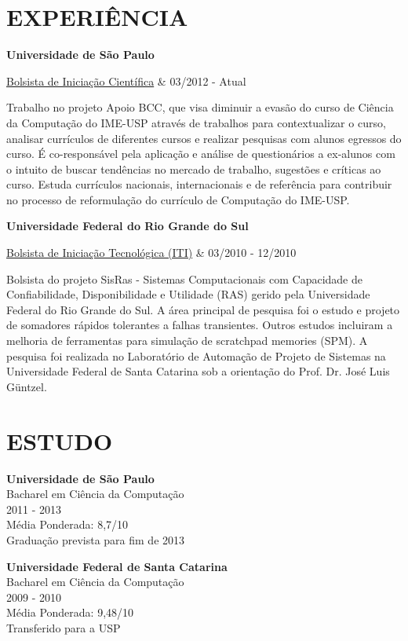 \documentclass[margin=<value>,11pt]{res} %
\begin{document}
\begin{resume}
\section{EXPERIÊNCIA}
	{\bf Universidade de São Paulo} \\
		\begin{ncolumn}{2} %
		\underline{Bolsista de Iniciação Científica}     &      03/2012 - Atual
		\end{ncolumn}
		Trabalho no projeto Apoio BCC, que visa diminuir a evasão do curso de Ciência da Computação do IME-USP através de trabalhos para contextualizar o curso, analisar currículos de diferentes cursos e realizar pesquisas com alunos egressos do curso. É co-responsável pela aplicação e análise de questionários a ex-alunos com o intuito de buscar tendências no mercado de trabalho, sugestões e críticas ao curso. Estuda currículos nacionais, internacionais e de referência para contribuir no processo de reformulação do currículo de Computação do IME-USP.

	{\bf Universidade Federal do Rio Grande do Sul} \\
		\begin{ncolumn}{2} %
		\underline{Bolsista de Iniciação Tecnológica (ITI)}     &      03/2010 - 12/2010
		\end{ncolumn}
		Bolsista do projeto SisRas - Sistemas Computacionais com Capacidade de Confiabilidade, Disponibilidade e Utilidade (RAS) gerido pela Universidade Federal do Rio Grande do Sul. A área principal de pesquisa foi o estudo e projeto de somadores rápidos tolerantes a falhas transientes. Outros estudos incluiram a melhoria de ferramentas para simulação de scratchpad memories (SPM). A pesquisa foi realizada no Laboratório de Automação de Projeto de Sistemas na Universidade Federal de Santa Catarina sob a orientação do Prof. Dr. José Luis Güntzel.

 
\section{ESTUDO} 
	{\bf Universidade de São Paulo}\\
	Bacharel em Ciência da Computação \\
	2011 - 2013 \\
	Média Ponderada: 8,7/10 \\
	Graduação prevista para fim de 2013

	{\bf Universidade Federal de Santa Catarina}\\
	Bacharel em Ciência da Computação \\
	2009 - 2010 \\
	Média Ponderada: 9,48/10 \\
	Transferido para a USP \\
 

\end{resume}
\end{document}
